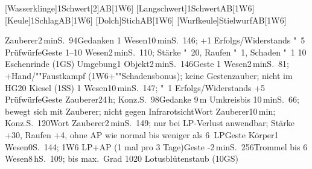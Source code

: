 \documentclass{m5figur-mv}[2014/12/31]
\begin{document}
{[Wasserklinge]{1Schwert}[2]{AB}[1W6]
[Langschwert]{1Schwert}{AB}[1W6]
[Keule]{1Schlag}{AB}[1W6]
[Dolch]{Stich}{AB}[1W6]
[Wurfkeule]{Stielwurf}{AB}[1W6]

{ %




%
  {Zauberer}{2\,min}{S.~94}{Gedanken}
%
  {1 Wesen}{10\,min}{S.~146; +1 Erfolgs/Widerstands "~5 Prüfwürfe}{Geste}
%
  {1--10 Wesen}{2\,min}{S.~110; Stärke "~20, Raufen "~1, Schaden "~1}%
  {10 Eschenrinde (1GS)}
%
  {Umgebung}{1 Objekt}{2\,min}{S.~146}{Geste}
%
  {1 Wesen}{2\,min}{S.~81; +Hand/""Faustkampf (1W6+""Schadensbonus);
  keine Gestenzauber; nicht im HG}{20 Kiesel (1SS)}
%
  {1 Wesen}{10\,min}{S.~147; "~1 Erfolgs/Widerstands +5 Prüfwürfe}{Geste}
%
  {Zauberer}{24\,h; Konz.}{S.~98}{Gedanke}
%
  {9\,m Umkreis}{bis 10\,min}{S.~66; bewegt sich mit Zauberer;
  nicht gegen Infrarotsicht}{Wort}
%
  {Zauberer}{10\,min; Konz.}{S.~120}{Wort}
%
  {Zauberer}{2\,min}{S.~149; nur bei LP-Verlust anwendbar;
  Stärke +30, Raufen +4, ohne AP wie normal bis weniger als 6~LP}{Geste}
%
  {Körper}{1 Wesen}{0}{S.~144; 1W6 LP+AP (1 mal pro 3 Tage)}{Geste}
%
  {-}{2\,min}{S.~256}{Trommel}
%
  {bis 6 Wesen}{8\,h}{S.~109; bis max.\ Grad 10}{20 Lotusblütenstaub (10GS)}


}}
\end{document}
